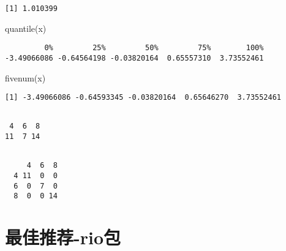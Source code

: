 \documentclass[
  letterpaper,
  DIV=11,
  numbers=noendperiod]{scrreprt}
\newenvironment{Shaded}{\begin{snugshade}}{\end{snugshade}}
\newcommand{\FunctionTok}[1]{\textcolor[rgb]{0.28,0.35,0.67}{#1}}
\newcommand{\NormalTok}[1]{\textcolor[rgb]{0.00,0.23,0.31}{#1}}
\newcommand{\SpecialCharTok}[1]{\textcolor[rgb]{0.37,0.37,0.37}{#1}}
\begin{document}
\begin{verbatim}
[1] 1.010399
\end{verbatim}

\begin{Shaded}
\begin{Highlighting}[]
\FunctionTok{quantile}\NormalTok{(x)}
\end{Highlighting}
\end{Shaded}

\begin{verbatim}
         0%         25%         50%         75%        100% 
-3.49066086 -0.64564198 -0.03820164  0.65557310  3.73552461 
\end{verbatim}

\begin{Shaded}
\begin{Highlighting}[]
\FunctionTok{fivenum}\NormalTok{(x)}
\end{Highlighting}
\end{Shaded}

\begin{verbatim}
[1] -3.49066086 -0.64593345 -0.03820164  0.65646270  3.73552461
\end{verbatim}

\begin{Shaded}
\end{Shaded}

\begin{verbatim}

 4  6  8 
11  7 14 
\end{verbatim}

\begin{Shaded}
\end{Shaded}

\begin{verbatim}
   
     4  6  8
  4 11  0  0
  6  0  7  0
  8  0  0 14
\end{verbatim}

\chapter{最佳推荐-rio包}\label{ux6700ux4f73ux63a8ux8350-rioux5305}
\end{document}
